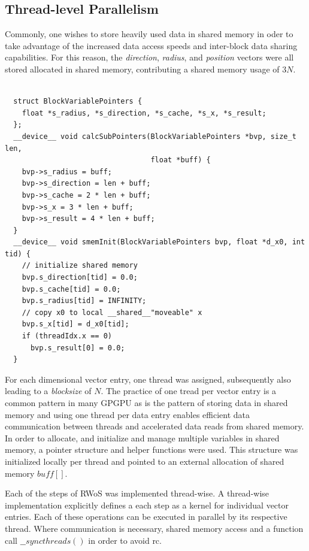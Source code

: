 \subsection{Thread-level Parallelism}\label{tlp}
Commonly, one wishes to store heavily used data in shared memory in oder to
take advantage of the increased data access speeds and inter-block data sharing
capabilities.  For this reason, the \textit{direction}, \textit{radius}, and \textit{position}
vectors were all stored allocated in shared memory, contributing a shared memory usage of
$3N$.
\begin{lstlisting}[caption="src/wos\_native.cuh",label=BlockVariablePointers]

  struct BlockVariablePointers {
    float *s_radius, *s_direction, *s_cache, *s_x, *s_result;
  };
  __device__ void calcSubPointers(BlockVariablePointers *bvp, size_t len,
                                  float *buff) {
    bvp->s_radius = buff;
    bvp->s_direction = len + buff;
    bvp->s_cache = 2 * len + buff;
    bvp->s_x = 3 * len + buff;
    bvp->s_result = 4 * len + buff;
  }
  __device__ void smemInit(BlockVariablePointers bvp, float *d_x0, int tid) {
    // initialize shared memory
    bvp.s_direction[tid] = 0.0;
    bvp.s_cache[tid] = 0.0;
    bvp.s_radius[tid] = INFINITY;
    // copy x0 to local __shared__"moveable" x
    bvp.s_x[tid] = d_x0[tid];
    if (threadIdx.x == 0)
      bvp.s_result[0] = 0.0;
  }
\end{lstlisting}

For each dimensional vector entry, one thread was assigned, subsequently
also leading to a \textit{blocksize} of $N$.  The practice of one tread per vector
entry is a common pattern in many \Gls{GPGPU} as is the pattern of storing data in shared
memory and using one thread per data entry enables efficient data communication
between threads and accelerated data reads from shared memory. In order to allocate,
and initialize and manage multiple variables in shared memory, a pointer structure and helper functions
were used.  This structure was initialized locally per thread and pointed to an
external allocation of shared memory $buff[ ]$.

Each of the steps of \Gls{RWoS} was implemented thread-wise.  A thread-wise implementation
explicitly defines a each step as a kernel for individual vector entries.  Each of these operations
can be executed in parallel by its respective thread.  Where communication is necessary,
shared memory access and a function call $\_\_syncthreads()$ in order to avoid \Gls{rc}.

